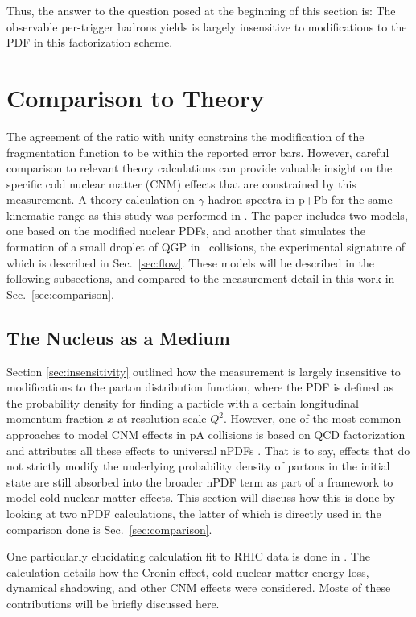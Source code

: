 Thus, the answer to the question posed at the beginning of this section is: The observable per-trigger hadrons yields is largely insensitive to modifications to the PDF in this factorization scheme.

\section{Comparison to Theory}
The agreement of the ratio with unity constrains the modification of the fragmentation function to be within the reported error bars. However, careful comparison to relevant theory calculations can provide valuable insight on the specific cold nuclear matter (CNM) effects that are constrained by this measurement. A theory calculation on $\gamma$-hadron spectra in p+Pb for the same kinematic range as this study was performed in \cite{Xie2021}. The paper includes two models, one based on the modified nuclear PDFs, and another that simulates the formation of a small droplet of QGP in \pPb~collisions, the experimental signature of which is described in Sec.~\ref{sec:flow}. These models will be described in the following subsections, and compared to the measurement detail in this work in Sec.~\ref{sec:comparison}.

\subsection{The Nucleus as a Medium}
\label{compare_cnm}

Section \ref{sec:insensitivity} outlined how the measurement is largely insensitive to modifications to the parton distribution function, where the PDF is defined as the probability density for finding a particle with a certain longitudinal momentum fraction $x$ at resolution scale $Q^2$.  However, one of the most common approaches to model CNM effects in pA collisions is based on QCD factorization and attributes all these effects to universal nPDFs \cite{Kang2012,Eskola2009a,Hirai2007}. That is to say, effects that do not strictly modify the underlying probability density of partons in the initial state are still absorbed into the broader nPDF term as part of a framework to model cold nuclear matter effects. This section will discuss how this is done by looking at two nPDF calculations, the latter of which is directly used in the comparison done is Sec.~\ref{sec:comparison}.
 
One particularly elucidating calculation fit to RHIC data is done in \cite{Kang2012}. The calculation details how the Cronin effect, cold nuclear matter energy loss, dynamical shadowing, and other CNM effects were considered. Moste of these contributions will be briefly discussed here.

